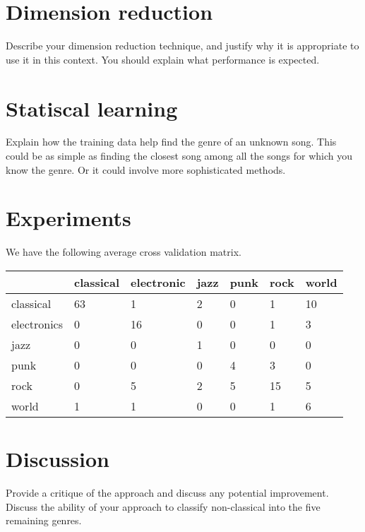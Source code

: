 \documentclass[12pt]{article}
\begin{document}
\section{Dimension reduction}
Describe your dimension reduction technique, and justify why it 
is appropriate to use it in this context. You should explain what 
performance is expected.
\section{Statiscal learning}
Explain how the training data help find the genre of an unknown
song. This could be as simple as finding the closest song among all
the songs for which you know the genre. Or it could involve more
sophisticated methods.
\section{Experiments}

We have the following average cross validation matrix. 
\begin{center}
 \begin{tabular}{l| |l | l | l | l | l | l | }
&classical &electronic& jazz &punk& rock &world \\ \hline \hline
classical &63 & 1 & 2 & 0 & 1 & 10 \\ \hline 
electronics& 0 & 16 & 0 & 0 & 1 & 3 \\ \hline 
jazz& 0 & 0 & 1 & 0 & 0 & 0 \\ \hline 
punk &0 & 0 & 0 & 4 & 3 & 0 \\ \hline 
rock& 0 & 5 & 2 & 5 & 15 & 5 \\ \hline 
world&1 & 1 & 0 & 0 & 1 & 6 \\ \hline 
\end{tabular}
\end{center}
\section{Discussion}
Provide a critique of the approach and discuss any potential
improvement. Discuss the ability of your approach to classify
non-classical into the five remaining genres.
\end{document}
